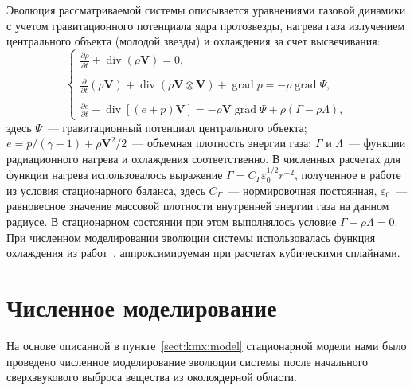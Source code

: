 Эволюция рассматриваемой системы описывается уравнениями
газовой динамики с учетом гравитационного потенциала ядра протозвезды,
нагрева газа излучением центрального объекта (молодой
звезды) и охлаждения за счет высвечивания:
\begin{equation}
\left\{
\begin{array}{l}
{\displaystyle \frac{\partial\rho}{\partial t} + \mathop\mathrm{div}\nolimits(\rho\mathbf{V}) = 0},
\\ \\
{\displaystyle \frac{\partial}{\partial t}(\rho\mathbf{V})
+ \mathop\mathrm{div}\nolimits(\rho\mathbf{V}\otimes\mathbf{V})
+ \mathop\mathrm{grad}\nolimits p = -\rho\mathop\mathrm{grad}\nolimits\Psi},
\\ \\
{\displaystyle \frac{\partial e}{\partial t} + \mathop\mathrm{div}\nolimits[(e + p)\mathbf{V}]
= -\rho\mathbf{V} \mathop\mathrm{grad}\nolimits\Psi + \rho(\Gamma - \rho\Lambda)},
\end{array}
\right.
\label{eq:kmx:HD-system}
\end{equation}
здесь $\Psi$~--- гравитационный потенциал центрального объекта;
${e = p/(\gamma-1) + \rho\mathbf{V}^2/2}$~--- объемная плотность
энергии газа; $\Gamma$ и $\Lambda$~--- функции радиационного
нагрева и охлаждения соответственно. В численных расчетах
для функции нагрева использовалось выражение
${\Gamma = C_\Gamma \varepsilon_0^{1/2} r^{-2}}$, полученное
в работе~\cite{kmx:kuzmin-etal-2002} из условия стационарного
баланса, здесь $C_\Gamma$~--- нормировочная постоянная,
$\varepsilon_0$~--- равновесное значение массовой плотности
внутренней энергии газа на данном радиусе. В стационарном
состоянии при этом выполнялось условие
${\Gamma - \rho\Lambda = 0}$. При численном моделировании эволюции
системы использовалась функция охлаждения из
работ~\cite{kmx:hardee-etal-1997, kmx:macdonald-etal-1981},
аппроксимируемая при расчетах кубическими сплайнами.


\section{Численное моделирование}
\label{sect:kmx:numerical}


На основе описанной в пункте~\ref{sect:kmx:model} стационарной модели
нами было проведено численное моделирование эволюции системы после
начального сверхзвукового выброса вещества из околоядерной области.

